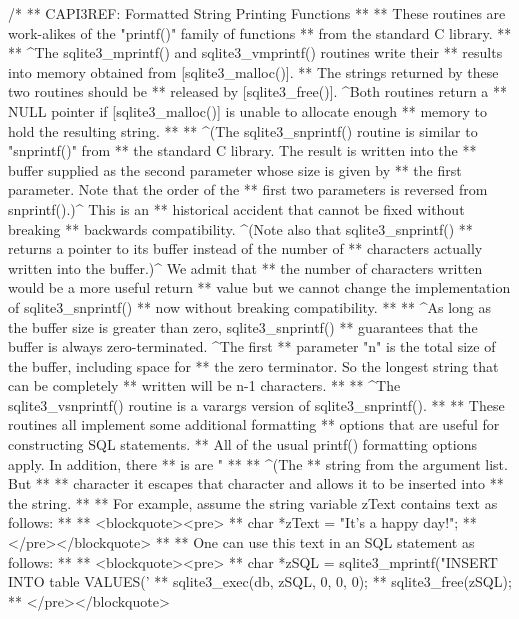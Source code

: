 \begin{Codex}[label=sqlite3.h,numbers=left]
{/*
** CAPI3REF: Formatted String Printing Functions
**
** These routines are work-alikes of the "printf()" family of functions
** from the standard C library.
**
** ^The sqlite3_mprintf() and sqlite3_vmprintf() routines write their
** results into memory obtained from [sqlite3_malloc()].
** The strings returned by these two routines should be
** released by [sqlite3_free()].  ^Both routines return a
** NULL pointer if [sqlite3_malloc()] is unable to allocate enough
** memory to hold the resulting string.
**
** ^(The sqlite3_snprintf() routine is similar to "snprintf()" from
** the standard C library.  The result is written into the
** buffer supplied as the second parameter whose size is given by
** the first parameter. Note that the order of the
** first two parameters is reversed from snprintf().)^  This is an
** historical accident that cannot be fixed without breaking
** backwards compatibility.  ^(Note also that sqlite3_snprintf()
** returns a pointer to its buffer instead of the number of
** characters actually written into the buffer.)^  We admit that
** the number of characters written would be a more useful return
** value but we cannot change the implementation of sqlite3_snprintf()
** now without breaking compatibility.
**
** ^As long as the buffer size is greater than zero, sqlite3_snprintf()
** guarantees that the buffer is always zero-terminated.  ^The first
** parameter "n" is the total size of the buffer, including space for
** the zero terminator.  So the longest string that can be completely
** written will be n-1 characters.
**
** ^The sqlite3_vsnprintf() routine is a varargs version of sqlite3_snprintf().
**
** These routines all implement some additional formatting
** options that are useful for constructing SQL statements.
** All of the usual printf() formatting options apply.  In addition, there
** is are "%
**
** ^(The %
** string from the argument list.  But %
** %
** character it escapes that character and allows it to be inserted into
** the string.
**
** For example, assume the string variable zText contains text as follows:
**
** <blockquote><pre>
**  char *zText = "It's a happy day!";
** </pre></blockquote>
**
** One can use this text in an SQL statement as follows:
**
** <blockquote><pre>
**  char *zSQL = sqlite3_mprintf("INSERT INTO table VALUES('%
**  sqlite3_exec(db, zSQL, 0, 0, 0);
**  sqlite3_free(zSQL);
** </pre></blockquote>
}
\end{Codex}
